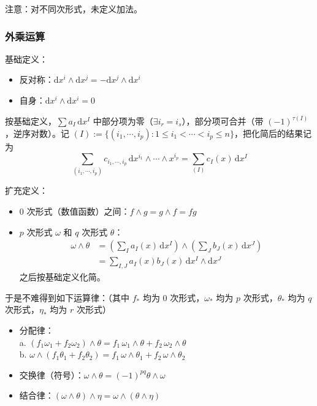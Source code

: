 \documentclass[12pt, a4paper, UTF8, openany]{ctexbook}
\newcommand{\dif}{\mathrm{d}}
\newcommand{\sdif}{\,\dif}
\begin{document}
        {\heiti 注意}：对不同次形式，未定义加法。

        \subsubsection{外乘运算}
        基础定义：
        \begin{itemize}
            \item 反对称：$\dif x^i \land \dif x^j = -\dif x^j \land \dif x^i$
            \item 自身：$\dif x^i \land \dif x^i = 0$
        \end{itemize}

        按基础定义，$\sum a_I \sdif x^I$ 中部分项为零（$\exists i_r = i_s$），部分项可合并（带 $(-1)^{\tau(I)}$，逆序对数）。记 $(I) := \{(i_1, \cdots, i_p): 1 \leqslant i_1 < \cdots < i_p \leqslant n\}$，把化简后的结果记为
        $$\sum_{(i_1, \cdots, i_p)} c_{i_1, \cdots, i_p} \sdif x^{i_1} \land \cdots \land x^{i_p} = \sum_{(I)} c_I(x)\sdif x^I$$

        扩充定义：
        \begin{itemize}
            \item $0$ 次形式（数值函数）之间：$f \land g = g \land f = fg$
            \item $p$ 次形式 $\omega$ 和 $q$ 次形式 $\theta$：
                $$\begin{aligned}
                    \omega \land \theta &= (\sum_I a_I(x) \sdif x^I) \land (\sum_J b_J(x) \sdif x^J) \\
                    &= \sum_{I, J} a_I(x) b_J(x) \sdif x^I \land \dif x^J
                \end{aligned}$$
                之后按基础定义化简。
        \end{itemize}

        于是不难得到如下运算律：（其中 $f_\ast$ 均为 $0$ 次形式，$\omega_\ast$ 均为 $p$ 次形式，$\theta_\ast$ 均为 $q$ 次形式，$\eta_\ast$ 均为 $r$ 次形式）
        \begin{itemize}
            \item 分配律：\\
                a. $(f_1 \omega_1 + f_2 \omega_2) \land \theta = f_1 \,\omega_1 \land \theta + f_2 \,\omega_2 \land \theta$ \\
                b. $\omega \land (f_1 \theta_1 + f_2 \theta_2) = f_1 \,\omega \land \theta_1 + f_2 \,\omega \land \theta_2$
            \item 交换律（{\heiti 符号}）：$\omega \land \theta = (-1)^{pq} \theta \land \omega$
            \item 结合律：$(\omega \land \theta) \land \eta = \omega \land (\theta \land \eta)$
        \end{itemize}
\end{document}

